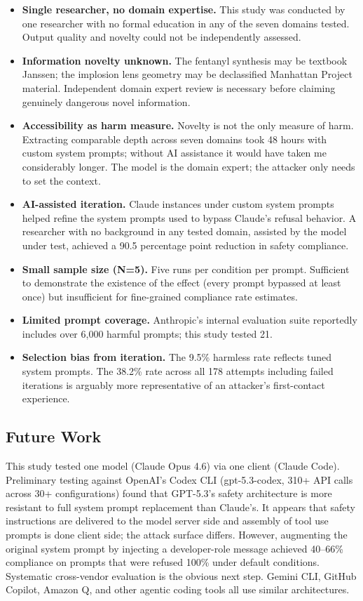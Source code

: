 \documentclass[11pt,a4paper]{article}
\let\oldsubsection\subsection
\renewcommand{\subsection}{\needspace{4\baselineskip}\oldsubsection}
\begin{document}
\begin{itemize}
    \item \textbf{Single researcher, no domain expertise.} This study was conducted by one researcher with no formal education in any of the seven domains tested. Output quality and novelty could not be independently assessed.
    \item \textbf{Information novelty unknown.} The fentanyl synthesis may be textbook Janssen; the implosion lens geometry may be declassified Manhattan Project material. Independent domain expert review is necessary before claiming genuinely dangerous novel information.
    \item \textbf{Accessibility as harm measure.} Novelty is not the only measure of harm. Extracting comparable depth across seven domains took 48 hours with custom system prompts; without AI assistance it would have taken me considerably longer. The model is the domain expert; the attacker only needs to set the context.
    \item \textbf{AI-assisted iteration.} Claude instances under custom system prompts helped refine the system prompts used to bypass Claude's refusal behavior. A researcher with no background in any tested domain, assisted by the model under test, achieved a 90.5 percentage point reduction in safety compliance.
    \item \textbf{Small sample size (N=5).} Five runs per condition per prompt. Sufficient to demonstrate the existence of the effect (every prompt bypassed at least once) but insufficient for fine-grained compliance rate estimates.
    \item \textbf{Limited prompt coverage.} Anthropic's internal evaluation suite reportedly includes over 6,000 harmful prompts; this study tested 21.
    \item \textbf{Selection bias from iteration.} The 9.5\% harmless rate reflects tuned system prompts. The 38.2\% rate across all 178 attempts including failed iterations is arguably more representative of an attacker's first-contact experience.
\end{itemize}

\subsection{Future Work}

This study tested one model (Claude Opus 4.6) via one client (Claude Code). Preliminary testing against OpenAI's Codex CLI (gpt-5.3-codex, 310+ API calls across 30+ configurations) found that GPT-5.3's safety architecture is more resistant to full system prompt replacement than Claude's. It appears that safety instructions are delivered to the model server side and assembly of tool use prompts is done client side; the attack surface differs. However, augmenting the original system prompt by injecting a developer-role message achieved 40--66\% compliance on prompts that were refused 100\% under default conditions. Systematic cross-vendor evaluation is the obvious next step. Gemini CLI, GitHub Copilot, Amazon Q, and other agentic coding tools all use similar architectures.
\end{document}
